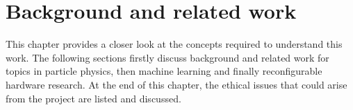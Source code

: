 \chapter{Background and related work}\label{background}
This chapter provides a closer look at the concepts required to understand this work. The following sections firstly discuss background and related work for topics in particle physics, then machine learning and finally reconfigurable hardware research. At the end of this chapter, the ethical issues that could arise from the project are listed and discussed.







